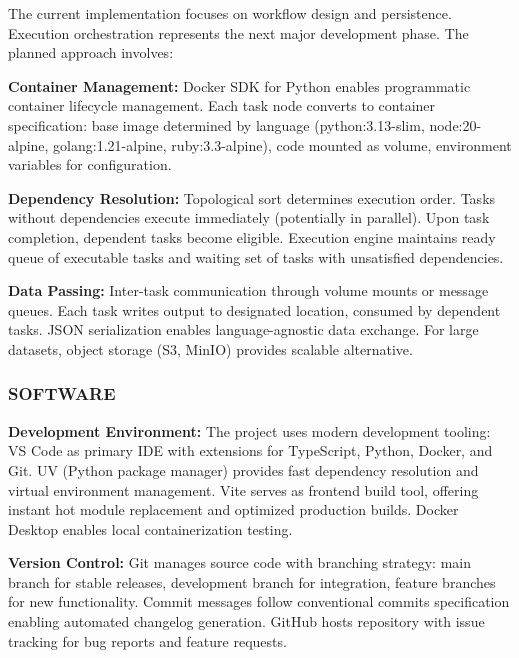 \documentclass[12pt]{article}
\begin{document}
\hspace{\parindent}The current implementation focuses on workflow design and persistence. Execution orchestration represents the next major development phase. The planned approach involves:

\hspace{\parindent}\textbf{Container Management:} Docker SDK for Python enables programmatic container lifecycle management. Each task node converts to container specification: base image determined by language (python:3.13-slim, node:20-alpine, golang:1.21-alpine, ruby:3.3-alpine), code mounted as volume, environment variables for configuration.

\hspace{\parindent}\textbf{Dependency Resolution:} Topological sort determines execution order. Tasks without dependencies execute immediately (potentially in parallel). Upon task completion, dependent tasks become eligible. Execution engine maintains ready queue of executable tasks and waiting set of tasks with unsatisfied dependencies.

\hspace{\parindent}\textbf{Data Passing:} Inter-task communication through volume mounts or message queues. Each task writes output to designated location, consumed by dependent tasks. JSON serialization enables language-agnostic data exchange. For large datasets, object storage (S3, MinIO) provides scalable alternative.

\subsubsection{SOFTWARE}

\hspace{\parindent}\textbf{Development Environment:} The project uses modern development tooling: VS Code as primary IDE with extensions for TypeScript, Python, Docker, and Git. UV (Python package manager) provides fast dependency resolution and virtual environment management. Vite serves as frontend build tool, offering instant hot module replacement and optimized production builds. Docker Desktop enables local containerization testing.

\hspace{\parindent}\textbf{Version Control:} Git manages source code with branching strategy: main branch for stable releases, development branch for integration, feature branches for new functionality. Commit messages follow conventional commits specification enabling automated changelog generation. GitHub hosts repository with issue tracking for bug reports and feature requests.
\end{document}
